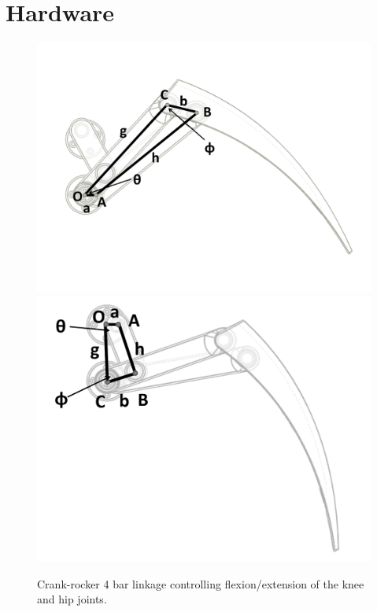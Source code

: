 \documentclass[letterpaper]{article}
\begin{document}
\section{Hardware}

\begin{figure}[t]
\begin{center}
\includegraphics[width=.23\textwidth]{fig3.pdf}
\includegraphics[width=.23\textwidth]{fig4.pdf}
\caption{Crank-rocker 4 bar linkage controlling flexion/extension of the knee and hip joints.}
\label{fig3}
\end{center}
\end{figure}

\end{document}
